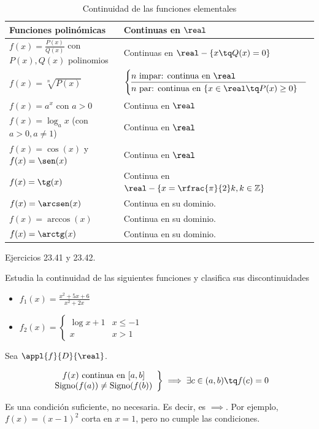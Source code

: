 \begin{table}[hbtp]
\begin{tabular}{|l|l|}
\hline
Funciones polinómicas & Continuas en $\real$\\\hline\hline
$f(x) = \frac{P(x)}{Q(x)}$ con $P(x),Q(x)$ polinomios& Continuas en $\real-\{x \tq Q(x)=0\}$\\\hline
$f(x) = \sqrt[n]{P(x)}$ & $\begin{cases}
n\text{ impar: continua en } \real\\\hline
n\text{ par: continua en } \{x\in\real\tq P(x) \geq 0\}\end{cases}$\\\hline
$f(x) = a^x$ con $a>0$ & Continua en $\real$\\\hline
$f(x) = \log_ax$ (con $a>0, a\neq 1$) & Continua en $\real$\\\hline
$f(x) = \cos(x)$ y $f(x) = \sen(x)$  & Continua en $\real$\\\hline
$f(x) = \tg(x)$   & Continua en $\real-\left\{x=\rfrac{\pi}{2}k, k\in\mathbb{Z}\right\}$\\\hline
$f(x) = \arcsen(x)$ & Continua en su dominio.\\
$f(x) = \arccos(x)$ & Continua en su dominio.\\
$f(x) = \arctg(x)$ & Continua en su dominio.\\\hline
\end{tabular}
\label{tbl::ContinuidadFunElementales}
\caption{Continuidad de las funciones elementales}
\end{table}

\begin{problem}
Ejercicios 23.41 y 23.42.
\solution
\end{problem}

\begin{problem}Estudia la continuidad de las siguientes funciones y clasifica sus discontinuidades

\begin{itemize}
	\item $f_1(x) = \displaystyle\frac{x^2+5x+6}{x^2+2x}$
	\item $f_2(x) = \begin{cases}\log{x+1} & x\leq -1\\x & x>1\end{cases}$
\end{itemize}
\solution
\end{problem}



\begin{theorem}
Sea $\appl{f}{D}{\real}$.

\[
\left.\begin{array}{c}f(x) \text{ continua en } [a,b]\\\text{Signo}(f(a))\neq \text{Signo}(f(b))\end{array}\right\}\implies \exists c\in(a,b) \tq f(c) = 0
\]

\end{theorem}
\obs Es una condición suficiente, no necesaria. Es decir, es $\implies $. Por ejemplo, $f(x) = (x-1)^2$ corta en $x=1$, pero no cumple las condiciones.

